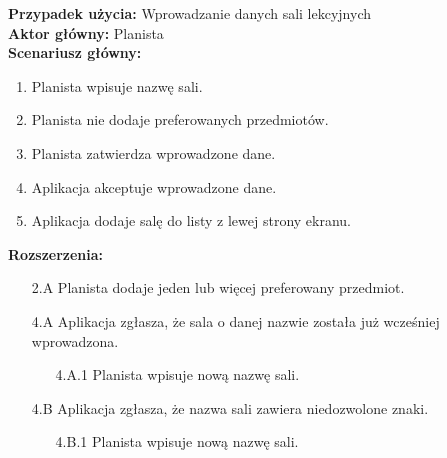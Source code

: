 \noindent
\textbf{Przypadek użycia:} Wprowadzanie danych sali lekcyjnych\\
\textbf{Aktor główny:} Planista\\
\textbf{Scenariusz główny:}
\begin{enumerate}
	\item Planista wpisuje nazwę sali.
	\item Planista nie dodaje preferowanych przedmiotów.
	\item Planista zatwierdza wprowadzone dane.
	\item Aplikacja akceptuje wprowadzone dane.
	\item Aplikacja dodaje salę do listy z lewej strony ekranu.
\end{enumerate}
\textbf{Rozszerzenia:}
	\begin{enumerate}
         \item[2.A] Planista dodaje jeden lub więcej preferowany przedmiot.
         \item[4.A] Aplikacja zgłasza, że sala o danej nazwie została już wcześniej wprowadzona.
         \begin{enumerate}
         	\item[4.A.1] Planista wpisuje nową nazwę sali.
         \end{enumerate}
         \item[4.B] Aplikacja zgłasza, że nazwa sali zawiera niedozwolone znaki.
         \begin{enumerate}
         	\item[4.B.1] Planista wpisuje nową nazwę sali.
         \end{enumerate}
	\end{enumerate}
	

